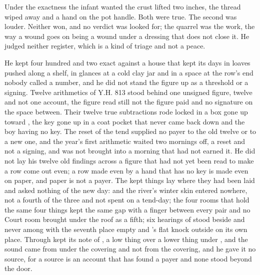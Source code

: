 Under the exactness the infant wanted the crust lifted two inches, the thread wiped away and a hand on the pot handle. Both were true. The second was louder. Neither won, and no verdict was looked for; the quarrel was the work, the way a wound goes on being a wound under a dressing that does not close it. He judged neither register, which is a kind of triage and not a peace.

He kept four hundred and two exact against a house that kept its days in loaves pushed along a shelf, in glances at a cold clay jar and in a space at the row's end nobody called a number, and he did not stand the figure up as a threshold or a signing. Twelve arithmetics of Y.H. 813 stood behind one unsigned figure, twelve and not one account, the figure read still not the figure paid and no signature on the space between. Their twelve true subtractions rode locked in a box gone up  toward , the key gone up in a coat pocket that never came back down and the boy having no key. The reset of the tend supplied no payer to the old twelve or to a new one, and the year's first arithmetic waited two mornings off, a reset and not a signing, and was not brought into a morning that had not earned it. He did not lay his twelve old findings across a figure that had not yet been read to make a row come out even; a row made even by a hand that has no key is made even on paper, and paper is not a payer. The kept things lay where they had been laid and asked nothing of the new day:  and the river's winter skin entered nowhere, not a fourth of the three and not spent on a tend-day; the four rooms that hold the same four things kept the same gap with a finger between every pair and no Court room brought under the roof as a fifth; six hearings of  stood beside and never among with the seventh place empty and 's flat knock outside on its own place. Through   kept its note of , a low thing over a lower thing under , and the sound came from under the covering and not from the covering, and he gave it no source, for a source is an account that has found a payer and none stood beyond the door.

\scenebreak

